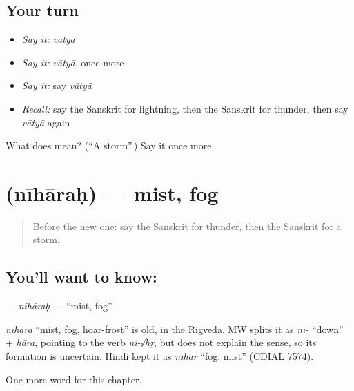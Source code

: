 \subsection*{Your turn}
\begin{itemize}
\raggedright
  \item \emph{Say it:} \emph{vātyā}
  \item \emph{Say it:} \emph{vātyā}, once more
  \item \emph{Say it:} say \emph{vātyā}
  \item \emph{Recall:} say the Sanskrit for lightning, then the Sanskrit for thunder, then say \emph{vātyā} again
\end{itemize}

\begin{tcolorbox}[breakable,colback=teal!4,colframe=teal!35!black,title={Before you move on}]
What does  mean? (\textquotedblleft{}A storm\textquotedblright{}.) Say it once more.
\end{tcolorbox}
\section[\texorpdfstring{\sk{नीहारः} (nīhāraḥ)}{नीहारः (nīhāraḥ)}]{ (nīhāraḥ) — mist, fog}

\label{lesson:SA-C111-niharah}



\begin{quote}
Before the new one: say the Sanskrit for thunder, then the Sanskrit for a storm.
\end{quote}

\subsection*{You'll want to know: }
\textbf{} — \emph{nīhāraḥ} — \textquotedblleft{}mist, fog\textquotedblright{}.

\begin{cousinweb}
\emph{nīhāra} \textquotedblleft{}mist, fog, hoar-frost\textquotedblright{} is old, in the Rigveda. MW splits it as \emph{nī-} \textquotedblleft{}down\textquotedblright{} + \emph{hāra}, pointing to the verb \emph{ni-√hṛ}, but does not explain the sense, so its formation is uncertain. Hindi kept it as \emph{nīhār} \textquotedblleft{}fog, mist\textquotedblright{} (CDIAL 7574).
\end{cousinweb}

\begin{grammarlens}[title={What you've built}]
One more word for this chapter.
\end{grammarlens}

